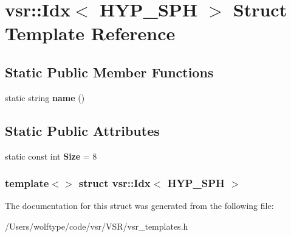 \hypertarget{structvsr_1_1_idx_3_01_h_y_p___s_p_h_01_4}{\section{vsr\-:\-:Idx$<$ H\-Y\-P\-\_\-\-S\-P\-H $>$ Struct Template Reference}
\label{structvsr_1_1_idx_3_01_h_y_p___s_p_h_01_4}
}
\subsection*{Static Public Member Functions}
\begin{DoxyCompactItemize}
\item 
\hypertarget{structvsr_1_1_idx_3_01_h_y_p___s_p_h_01_4_a2f8652f9526ca986c70822287904ecd9}{static string {\bfseries name} ()}\label{structvsr_1_1_idx_3_01_h_y_p___s_p_h_01_4_a2f8652f9526ca986c70822287904ecd9}

\end{DoxyCompactItemize}
\subsection*{Static Public Attributes}
\begin{DoxyCompactItemize}
\item 
\hypertarget{structvsr_1_1_idx_3_01_h_y_p___s_p_h_01_4_a8fb0f40fc34fd7056c5fe36eb71f9e66}{static const int {\bfseries Size} = 8}\label{structvsr_1_1_idx_3_01_h_y_p___s_p_h_01_4_a8fb0f40fc34fd7056c5fe36eb71f9e66}

\end{DoxyCompactItemize}
\subsubsection*{template$<$$>$ struct vsr\-::\-Idx$<$ H\-Y\-P\-\_\-\-S\-P\-H $>$}



The documentation for this struct was generated from the following file\-:\begin{DoxyCompactItemize}
\item 
/\-Users/wolftype/code/vsr/\-V\-S\-R/vsr\-\_\-templates.\-h\end{DoxyCompactItemize}
